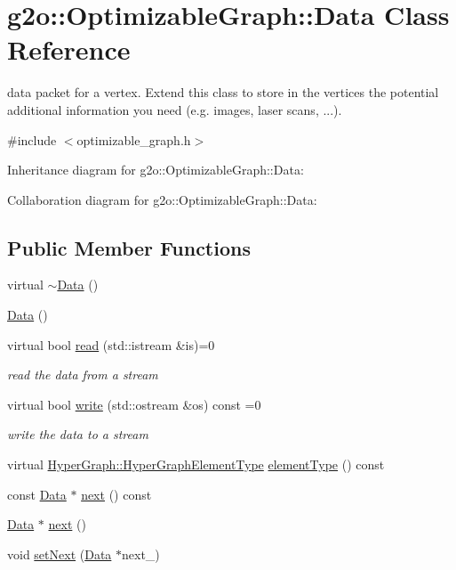 \hypertarget{classg2o_1_1OptimizableGraph_1_1Data}{}\section{g2o\+:\+:Optimizable\+Graph\+:\+:Data Class Reference}
\label{classg2o_1_1OptimizableGraph_1_1Data}


data packet for a vertex. Extend this class to store in the vertices the potential additional information you need (e.\+g. images, laser scans, ...).  




{\ttfamily \#include $<$optimizable\+\_\+graph.\+h$>$}



Inheritance diagram for g2o\+:\+:Optimizable\+Graph\+:\+:Data\+:


Collaboration diagram for g2o\+:\+:Optimizable\+Graph\+:\+:Data\+:
\subsection*{Public Member Functions}
\begin{DoxyCompactItemize}
\item 
virtual \hyperlink{classg2o_1_1OptimizableGraph_1_1Data_aa81fb1975f34e3aaf4c5110f7778a54e}{$\sim$\+Data} ()
\item 
\hyperlink{classg2o_1_1OptimizableGraph_1_1Data_a647b9fcb65aa8309f7103635135ea513}{Data} ()
\item 
virtual bool \hyperlink{classg2o_1_1OptimizableGraph_1_1Data_a4a206c86daba1b47425199befd2e1ed4}{read} (std\+::istream \&is)=0
\begin{DoxyCompactList}\small\item\em read the data from a stream \end{DoxyCompactList}\item 
virtual bool \hyperlink{classg2o_1_1OptimizableGraph_1_1Data_ad80cd8ea8013c54c766684ec0ef3daa3}{write} (std\+::ostream \&os) const =0
\begin{DoxyCompactList}\small\item\em write the data to a stream \end{DoxyCompactList}\item 
virtual \hyperlink{classg2o_1_1HyperGraph_af603119d5d3475aed6e34ee9d701b69e}{Hyper\+Graph\+::\+Hyper\+Graph\+Element\+Type} \hyperlink{classg2o_1_1OptimizableGraph_1_1Data_aa549949b0bf442face4e3b06d1934706}{element\+Type} () const 
\item 
const \hyperlink{classg2o_1_1OptimizableGraph_1_1Data}{Data} $\ast$ \hyperlink{classg2o_1_1OptimizableGraph_1_1Data_a7438fd566ec8b29680f13cffd2cf85f3}{next} () const 
\item 
\hyperlink{classg2o_1_1OptimizableGraph_1_1Data}{Data} $\ast$ \hyperlink{classg2o_1_1OptimizableGraph_1_1Data_af9c0427357f1e81f9008c3173fddf34c}{next} ()
\item 
void \hyperlink{classg2o_1_1OptimizableGraph_1_1Data_a5811aac3f8eab3c19207663e946b343b}{set\+Next} (\hyperlink{classg2o_1_1OptimizableGraph_1_1Data}{Data} $\ast$next\+\_\+)
\end{DoxyCompactItemize}
